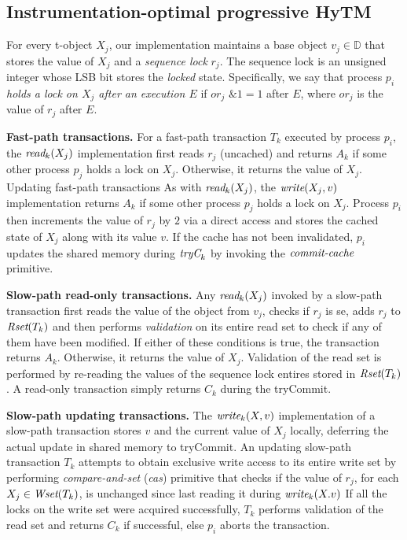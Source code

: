 \subsection{Instrumentation-optimal progressive HyTM }
\label{sec:hytm1}
%
%
For every t-object $X_j$, our implementation maintains a base object $v_j\in \mathbb{D}$ that stores the value of $X_j$
and a \emph{sequence lock} $r_{j}$. The sequence lock is an unsigned integer whose LSB bit stores the \emph{locked} state.
Specifically, we say that process $p_i$ \emph{holds a lock on $X_j$ after an execution $E$} if
$\textit{or}_j$ $\mathrel{\&} 1=1$ after $E$, where $\textit{or}_j$ is the value of $r_j$ after $E$.

\vspace{1mm}\noindent\textbf{Fast-path transactions.}
For a fast-path transaction $T_k$ executed by process $p_i$, the $\textit{read}_k(X_j)$ implementation first reads $r_j$ (uncached)
and returns $A_k$ if some other process $p_j$ holds a lock on $X_j$.
Otherwise, it returns the value of $X_j$.
Updating fast-path transactions 
As with $\textit{read}_k(X_j)$, the $\textit{write} (X_j,v)$ implementation returns $A_k$ if some other process $p_j$ holds a lock on $X_j$.
Process $p_i$ then increments the value of $r_j$ by $2$ via a direct access and stores the cached state of $X_j$ along with its value $v$.
If the cache has not been invalidated, $p_i$ updates the shared memory
during $\textit{tryC}_k$ by invoking the $\ms{commit-cache}$ primitive.

\vspace{1mm}\noindent\textbf{Slow-path read-only transactions.}
Any $\textit{read}_k(X_j)$ invoked by a slow-path transaction first reads the value of the object from $v_j$, 
checks if $r_j$ is se, adds $r_j$ to $\textit{Rset}(T_k)$
and then performs \emph{validation} on its entire read set to check if any of them have been modified. 
If either of these conditions is true,
the transaction returns $A_k$. Otherwise, it returns the value of $X_j$. 
Validation of the read set is performed by re-reading the values of the sequence lock entires stored in $\textit{Rset}(T_k)$.
A read-only transaction simply returns $C_k$ during the tryCommit.

\vspace{1mm}\noindent\textbf{Slow-path updating transactions.}
The $\textit{write}_k(X,v)$ implementation of a slow-path transaction stores
$v$ and the current value of $X_j$ locally, 
deferring the actual update in shared memory to tryCommit. 
An updating slow-path transaction $T_k$ attempts to obtain exclusive write access to its 
entire write set by performing \emph{compare-and-set} (\emph{cas})
primitive that checks if the value of $r_j$, for each $X_j\in \textit{Wset}(T_k)$, is unchanged since last reading it during $\textit{write}_k(X.v)$
If all the locks on the write set were acquired successfully, $T_k$ performs validation of the read set and returns $C_k$ if successful, else $p_i$ aborts the transaction.

